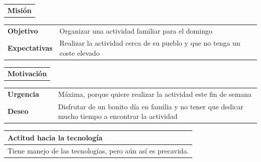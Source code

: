 \documentclass[11pt]{article}
\begin{document}
\begin{table}[H]
  \begin{tabular}{l}
    \textbf{Misión} 
  \end{tabular}
  
  \begin{tabular}{p{0.2\linewidth}|p{0.8\linewidth}}
    \toprule
    \textbf{Objetivo} & Organizar una actividad familiar para el domingo\\
    \textbf{Expectativas}  & Realizar la actividad cerca de su pueblo y que no tenga un coste elevado \\
    \bottomrule
  \end{tabular}

  \begin{tabular}{l}
    \textbf{Motivación} 
  \end{tabular}

  \begin{tabular}{p{0.2\linewidth}|p{0.8\linewidth}}
    \toprule
    \textbf{Urgencia} & Máxima, porque quiere realizar la actividad este fin de semana\\
    \textbf{Deseo}  & Disfrutar de un bonito día en familia y no tener que dedicar mucho tiempo a encontrar la actividad\\
    \bottomrule
  \end{tabular}

  \begin{tabular}{p{1.028\linewidth}}
    \textbf{Actitud hacia la tecnología}\\
    \midrule
    Tiene manejo de las tecnologías, pero aún así es precavida.  
  \end{tabular}
\end{table}
\end{document}
